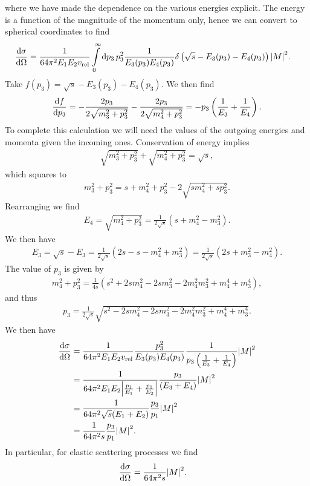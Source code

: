 where we have made the dependence on the various energies explicit. The energy is a function of the  magnitude of the momentum only, hence we can convert to spherical coordinates to find
\begin{align*}
	\dv{\sigma}{\Omega} &= \frac{1}{64\pi^{2}E_{1}E_{2}v_{\text{rel}}}\int\limits_{0}^{\infty}\dd{p_{3}}p_{3}^{2}\frac{1}{E_{3}(p_{3})E_{4}(p_{3})}\delta\left(\sqrt{s} - E_{3}(p_{3}) - E_{4}(p_{3})\right)\abs{M}^{2}.
\end{align*}
Take $f(p_{3}) = \sqrt{s} - E_{3}(p_{3}) - E_{4}(p_{3})$. We then find
\begin{align*}
	\dv{f}{p_{3}} = -\frac{2p_{3}}{2\sqrt{m_{3}^{2} + p_{3}^{2}}} - \frac{2p_{3}}{2\sqrt{m_{4}^{2} + p_{3}^{2}}} = -p_{3}\left(\frac{1}{E_{3}} + \frac{1}{E_{4}}\right).
\end{align*}
To complete this calculation we will need the values of the outgoing energies and momenta given the incoming ones. Conservation of energy implies
\begin{align*}
	\sqrt{m_{3}^{2} + p_{3}^{2}} + \sqrt{m_{4}^{2} + p_{3}^{2}} = \sqrt{s},
\end{align*}
which squares to
\begin{align*}
	m_{3}^{2} + p_{3}^{2} = s + m_{4}^{2} + p_{3}^{2} - 2\sqrt{sm_{4}^{2} + sp_{3}^{2}}.
\end{align*}
Rearranging we find
\begin{align*}
	E_{4} = \sqrt{m_{4}^{2} + p_{3}^{2}} = \frac{1}{2\sqrt{s}}(s + m_{4}^{2} - m_{3}^{2}).
\end{align*}
We then have
\begin{align*}
	E_{3} = \sqrt{s} - E_{3} = \frac{1}{2\sqrt{s}}(2s - s - m_{4}^{2} + m_{3}^{2}) = \frac{1}{2\sqrt{s}}(2s + m_{3}^{2} - m_{4}^{2}).
\end{align*}
The value of $p_{3}$ is given by
\begin{align*}
	m_{4}^{2} + p_{3}^{2} = \frac{1}{4s}(s^{2}+ 2sm_{4}^{2} - 2sm_{3}^{2} - 2m_{4}^{2}m_{3}^{2} + m_{4}^{4} + m_{3}^{4}),
\end{align*}
and thus
\begin{align*}
	p_{3} = \frac{1}{2\sqrt{s}}\sqrt{s^{2} - 2sm_{4}^{2} - 2sm_{3}^{2} - 2m_{4}^{2}m_{3}^{2} + m_{4}^{4} + m_{3}^{4}}.
\end{align*}
We then have
\begin{align*}
	\dv{\sigma}{\Omega} &= \frac{1}{64\pi^{2}E_{1}E_{2}v_{\text{rel}}}\frac{p_{3}^{2}}{E_{3}(p_{3})E_{4}(p_{3})}\frac{1}{p_{3}\left(\frac{1}{E_{3}} + \frac{1}{E_{4}}\right)}\abs{M}^{2} \\
	                    &= \frac{1}{64\pi^{2}E_{1}E_{2}\abs{\frac{p_{1}}{E_{1}} + \frac{p_{1}}{E_{2}}}}\frac{p_{3}}{\left(E_{3} + E_{4}\right)}\abs{M}^{2} \\
	                    &= \frac{1}{64\pi^{2}\sqrt{s}(E_{1} + E_{2})}\frac{p_{3}}{p_{1}}\abs{M}^{2} \\
	                    &= \frac{1}{64\pi^{2}s}\frac{p_{3}}{p_{1}}\abs{M}^{2}.
\end{align*}
In particular, for elastic scattering processes we find
\begin{align*}
	\dv{\sigma}{\Omega} &= \frac{1}{64\pi^{2}s}\abs{M}^{2}.
\end{align*}


